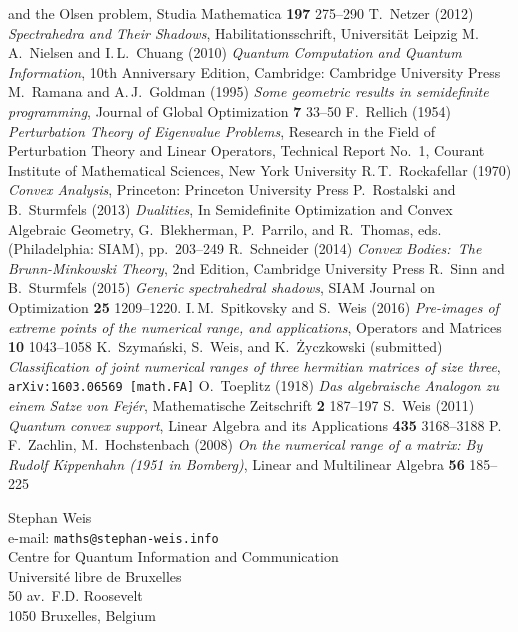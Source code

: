 \documentclass[12pt]{amsart}
\theoremstyle{definition}
\numberwithin{equation}{section}
\begin{document}
\begin{thebibliography}{10}
{and the Olsen problem},
Studia Mathematica {\bf 197} 275--290
 T.~Netzer (2012) 
{\em Spectrahedra and Their Shadows}, Habilitationsschrift, 
Universität Leipzig
 M.\,A.~Nielsen and I.\,L.~Chuang (2010)
{\em Quantum Computation and Quantum Information}, 
10th Anniversary Edition, Cambridge: Cambridge University Press
 M.~Ramana and A.\,J.~Goldman (1995)
{\em Some geometric results in semidefinite programming},
Journal of Global Optimization {\bf 7} 33--50
 F.~Rellich (1954)
{\em Perturbation Theory of Eigenvalue Problems},
Research in the Field of Perturbation Theory and Linear Operators,
Technical Report No.~1,
Courant Institute of Mathematical Sciences, New York University
 R.\,T.~Rockafellar (1970)
{\em Convex Analysis}, 
Princeton: Princeton University Press
 P.~Rostalski and B.~Sturmfels (2013)
{\em Dualities}, In Semidefinite Optimization and Convex Algebraic Geometry, 
G.~Blekherman, P.~Parrilo, and R.~Thomas, eds. (Philadelphia: SIAM), 
pp.~203--249
 R.~Schneider (2014)
{\em Convex Bodies:\ The Brunn-Minkowski Theory}, 2nd Edition,
Cambridge University Press
 R.~Sinn and B.~Sturmfels (2015)
{\em Generic spectrahedral shadows}, 
SIAM Journal on Optimization {\bf 25} 1209--1220.
 I.\,M.~Spitkovsky and S.~Weis (2016)
{\em Pre-images of extreme points of the numerical range, and applications}, 
Operators and Matrices {\bf 10} 1043--1058
 K.~Szyma\'nski, S.~Weis, and K.~\.Zyczkowski 
(submitted)
{\em Classification of joint numerical ranges of three hermitian matrices 
of size three}, 
\texttt{arXiv:1603.06569 [math.FA]}
 O.~Toeplitz (1918)
{\em Das algebraische Analogon zu einem Satze von Fej\'er},
Mathematische Zeitschrift {\bf 2} 187--197 
 S.~Weis (2011) 
{\em Quantum convex support},
Linear Algebra and its Applications {\bf 435} 3168--3188
 P.\,F.~Zachlin, M.~Hochstenbach (2008) 
{\em On the numerical range of a matrix: By Rudolf Kippenhahn (1951 in Bomberg)},
Linear and Multilinear Algebra {\bf 56} 185--225
\end{thebibliography}
\vspace{1cm}
\parbox{12cm}{Stephan Weis\\
e-mail: {\tt maths@stephan-weis.info}\\[.5\baselineskip]
Centre for Quantum Information and Communication \\
Université libre de Bruxelles \\
50 av.~F.D. Roosevelt \\
1050 Bruxelles, Belgium}
\end{document}
